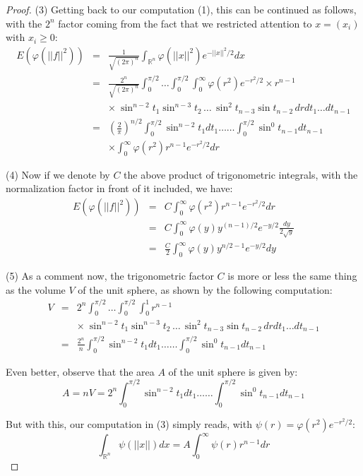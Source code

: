 \documentclass[12pt]{amsbook}
\begin{document}
\begin{proof}
(3) Getting back to our computation (1), this can be continued as follows, with the $2^n$ factor coming from the fact that we restricted attention to $x=(x_i)$ with $x_i\geq0$:
\begin{eqnarray*}
E\left(\varphi(||f||^2)\right)
&=&\frac{1}{\sqrt{(2\pi)^n}}\int_{\mathbb R^n}\varphi(||x||^2)e^{-||x||^2/2}dx\\
&=&\frac{2^n}{\sqrt{(2\pi)^n}}\int_0^{\pi/2}\ldots\int_0^{\pi/2}\int_0^\infty\varphi(r^2)e^{-r^2/2}\times r^{n-1}\\
&&\times\ \sin^{n-2}t_1\sin^{n-3}t_2\,\ldots\,\sin^2t_{n-3}\sin t_{n-2}\,drdt_1\ldots dt_{n-1}\\
&=&\left(\frac{2}{\pi}\right)^{n/2}\int_0^{\pi/2}\sin^{n-2}t_1dt_1\ldots\ldots\int_0^{\pi/2}\sin^0t_{n-1}dt_{n-1}\\
&&\times\int_0^\infty\varphi(r^2)r^{n-1}e^{-r^2/2}dr
\end{eqnarray*}

(4) Now if we denote by $C$ the above product of trigonometric integrals, with the normalization factor in front of it included, we have:
\begin{eqnarray*}
E\left(\varphi(||f||^2)\right)
&=&C\int_0^\infty\varphi(r^2)r^{n-1}e^{-r^2/2}dr\\
&=&C\int_0^\infty\varphi(y)y^{(n-1)/2}e^{-y/2}\frac{dy}{2\sqrt{y}}\\
&=&\frac{C}{2}\int_0^\infty\varphi(y)y^{n/2-1}e^{-y/2}dy
\end{eqnarray*}

(5) As a comment now, the trigonometric factor $C$ is more or less the same thing as the volume $V$ of the unit sphere, as shown by the following computation:
\begin{eqnarray*}
V
&=&2^n\int_0^{\pi/2}\ldots\int_0^{\pi/2}\int_0^1r^{n-1}\\
&&\times\ \sin^{n-2}t_1\sin^{n-3}t_2\,\ldots\,\sin^2t_{n-3}\sin t_{n-2}\,drdt_1\ldots dt_{n-1}\\
&=&\frac{2^n}{n}\int_0^{\pi/2}\sin^{n-2}t_1dt_1\ldots\ldots\int_0^{\pi/2}\sin^0t_{n-1}dt_{n-1}
\end{eqnarray*}

Even better, observe that the area $A$ of the unit sphere is given by:
$$A=nV=2^n\int_0^{\pi/2}\sin^{n-2}t_1dt_1\ldots\ldots\int_0^{\pi/2}\sin^0t_{n-1}dt_{n-1}$$

But with this, our computation in (3) simply reads, with $\psi(r)=\varphi(r^2)e^{-r^2/2}$:
$$\int_{\mathbb R^n}\psi(||x||)dx=A\int_0^\infty\psi(r)r^{n-1}dr$$


\end{proof}
\end{document}
